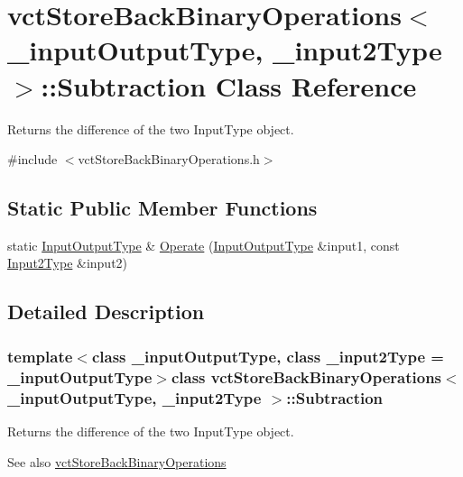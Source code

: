 \hypertarget{classvct_store_back_binary_operations_1_1_subtraction}{}\section{vct\+Store\+Back\+Binary\+Operations$<$ \+\_\+input\+Output\+Type, \+\_\+input2\+Type $>$\+:\+:Subtraction Class Reference}
\label{classvct_store_back_binary_operations_1_1_subtraction}


Returns the difference of the two Input\+Type object.  




{\ttfamily \#include $<$vct\+Store\+Back\+Binary\+Operations.\+h$>$}

\subsection*{Static Public Member Functions}
\begin{DoxyCompactItemize}
\item 
static \hyperlink{classvct_store_back_binary_operations_a9dc481d9e1345541dd5d833d5e5688f3}{Input\+Output\+Type} \& \hyperlink{classvct_store_back_binary_operations_1_1_subtraction_ab9110b1407c328feb9953cd48a4f7e35}{Operate} (\hyperlink{classvct_store_back_binary_operations_a9dc481d9e1345541dd5d833d5e5688f3}{Input\+Output\+Type} \&input1, const \hyperlink{classvct_store_back_binary_operations_a65a7197563c794a879fb50a406e70c8f}{Input2\+Type} \&input2)
\end{DoxyCompactItemize}


\subsection{Detailed Description}
\subsubsection*{template$<$class \+\_\+input\+Output\+Type, class \+\_\+input2\+Type = \+\_\+input\+Output\+Type$>$class vct\+Store\+Back\+Binary\+Operations$<$ \+\_\+input\+Output\+Type, \+\_\+input2\+Type $>$\+::\+Subtraction}

Returns the difference of the two Input\+Type object. 

\begin{DoxySeeAlso}{See also}
\hyperlink{classvct_store_back_binary_operations}{vct\+Store\+Back\+Binary\+Operations} 
\end{DoxySeeAlso}


